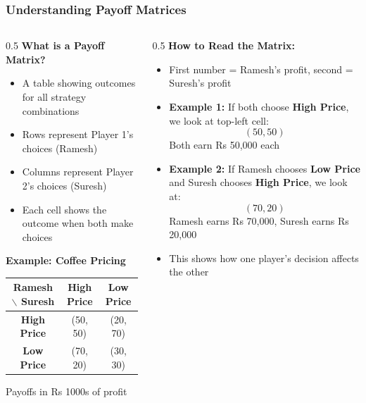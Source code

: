 \begin{frame}[fragile]\frametitle{Understanding Payoff Matrices}
\begin{columns}
    \begin{column}[T]{0.5\linewidth}
      \textbf{What is a Payoff Matrix?}
      \begin{itemize}
        \item A table showing outcomes for all strategy combinations
        \item Rows represent Player 1's choices (Ramesh)
        \item Columns represent Player 2's choices (Suresh)
        \item Each cell shows the outcome when both make choices
      \end{itemize}
      
      \vspace{6pt}
      \textbf{Example: Coffee Pricing}
      \begin{center}
      \begin{tabular}{|c|c|c|}
        \hline
        \textbf{Ramesh $\backslash$ Suresh} & \textbf{High Price} & \textbf{Low Price} \\
        \hline
        \textbf{High Price} & (50, 50) & (20, 70) \\
        \hline
        \textbf{Low Price} & (70, 20) & (30, 30) \\
        \hline
      \end{tabular}
      \end{center}
      \small{Payoffs in Rs 1000s of profit}
    \end{column}
    \begin{column}[T]{0.5\linewidth}
      \textbf{How to Read the Matrix:}
      \begin{itemize}
        \item First number = Ramesh's profit, second = Suresh's profit
        
        \item \textbf{Example 1:}  
        If both choose \textbf{High Price}, we look at top-left cell:  
        \[
        (50, 50)
        \]
        Both earn Rs 50,000 each
        
        \item \textbf{Example 2:}  
        If Ramesh chooses \textbf{Low Price} and Suresh chooses \textbf{High Price}, we look at:
        \[
        (70, 20)
        \]
        Ramesh earns Rs 70,000, Suresh earns Rs 20,000
        
        \item This shows how one player's decision affects the other
      \end{itemize}
    \end{column}
  \end{columns}
\end{frame}

